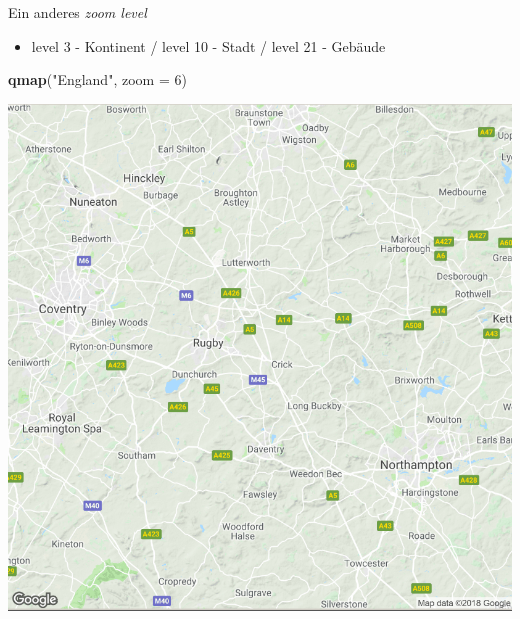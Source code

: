 \documentclass[ignorenonframetext,]{beamer}
\newenvironment{Shaded}{\begin{snugshade}}{\end{snugshade}}
\newcommand{\DataTypeTok}[1]{\textcolor[rgb]{0.13,0.29,0.53}{#1}}
\newcommand{\DecValTok}[1]{\textcolor[rgb]{0.00,0.00,0.81}{#1}}
\newcommand{\KeywordTok}[1]{\textcolor[rgb]{0.13,0.29,0.53}{\textbf{#1}}}
\newcommand{\NormalTok}[1]{#1}
\newcommand{\StringTok}[1]{\textcolor[rgb]{0.31,0.60,0.02}{#1}}
\providecommand{\tightlist}{%
  \setlength{\itemsep}{0pt}\setlength{\parskip}{0pt}}
\begin{document}
\begin{frame}[fragile]{Ein anderes \emph{zoom level}}
\protect\hypertarget{ein-anderes-zoom-level}{}

\begin{itemize}
\tightlist
\item
  level 3 - Kontinent / level 10 - Stadt / level 21 - Gebäude
\end{itemize}

\begin{Shaded}
\begin{Highlighting}[]
\KeywordTok{qmap}\NormalTok{(}\StringTok{"England"}\NormalTok{, }\DataTypeTok{zoom =} \DecValTok{6}\NormalTok{)}
\end{Highlighting}
\end{Shaded}

\includegraphics{figure/EnglandMap.PNG}

\end{frame}
\end{document}

